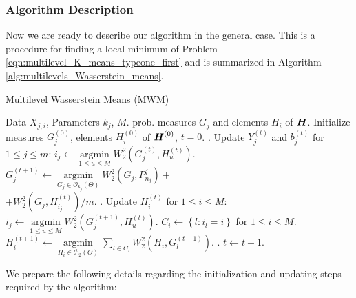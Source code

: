 \subsubsection{Algorithm Description} \label{Section:mwm_algorithm}
Now we are ready to describe our algorithm in the general case. This is
a procedure for finding a local minimum of Problem \eqref{eqn:multilevel_K_means_typeone_first} and
is summarized in Algorithm \ref{alg:multilevels_Wasserstein_means}. 
\begin{algorithm}[tb]
   \caption{Multilevel Wasserstein Means (MWM)}
   \label{alg:multilevels_Wasserstein_means}
\begin{algorithmic}
    Data $X_{j,i}$, Parameters $k_{j}$, $M$.
    prob. measures $G_{j}$ and elements $H_{i}$ of $\boldsymbol{H}$.
   \STATE Initialize measures $G_{j}^{(0)}$, elements $H_{i}^{(0)}$ of $\boldsymbol{H}^{(0)}$, $t=0$.
   . Update $Y_{j}^{(t)}$ and $b_{j}^{(t)}$ for $1 \leq j \leq m$:
   \STATE $i_{j} \leftarrow \mathop {\arg \min}\limits_{1 \leq u \leq M}{W_{2}^{2}(G_{j}^{(t)},H_{u}^{(t)})}$.
   \STATE $G_{j}^{(t+1)} \leftarrow \mathop {\arg \min }\limits_{G_{j} \in \mathcal{O}_{k_{j}}(\Theta)}{W_{2}^{2}(G_{j},P_{n_{j}}^{j})}+$\\$+W_{2}^{2}(G_{j},H_{i_{j}}^{(t)})/m$.
   \ENDFOR
   . Update $H_{i}^{(t)}$ for $1 \leq i \leq M$:
   \STATE $i_{j} \leftarrow \mathop {\arg \min}\limits_{1 \leq u \leq M}{W_{2}^{2}(G_{j}^{(t+1)},H_{u}^{(t)})}$.
   \ENDFOR
   \STATE $C_{i} \leftarrow \left\{l: i_{l}=i\right\}$ for $1 \leq i \leq M$.
   \STATE $H_{i}^{(t+1)} \leftarrow \mathop {\arg \min }\limits_{H_{i} \in \mathcal{P}_{2}(\Theta)}{\sum \limits_{l \in C_{i}}{W_{2}^{2}(H_{i}, G_{l}^{(t+1)})}}$.
   \ENDFOR
   . $t \leftarrow t+1$.
   \ENDWHILE
\end{algorithmic}
\end{algorithm}
We prepare the following details regarding the initialization and updating steps required by
the algorithm: 
